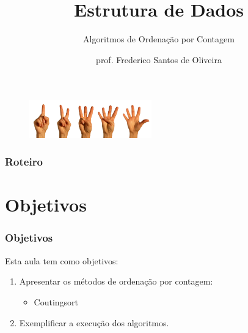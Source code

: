 \documentclass[aspectratio=169]{beamer}
\title[Algoritmos de Ordenação por Contagem]{Estrutura de Dados}
\subtitle{Algoritmos de Ordenação por Contagem}
\author[Frederico Santos de Oliveira]{prof. Frederico Santos de Oliveira}
\institute[UFMT]{Universidade Federal de Mato Grosso\\ Instituto de Engenharia}
\date{}
\begin{document}
\begin{frame}
\titlepage %

\begin{figure}[!h]
  \centering
  \includegraphics[width=150pt]{imgs/introducao.jpg}
  \label{fig_introducao}
\end{figure}
\end{frame}


\begin{frame}
\frametitle{Roteiro} %
\tableofcontents %
\end{frame}


\section{Objetivos}

\begin{frame}
\frametitle{Objetivos}

Esta aula tem como objetivos:

\begin{enumerate}
\item Apresentar os métodos de ordenação por contagem:
\begin{itemize}
 \item Coutingsort
 \end{itemize}
\item Exemplificar a execução dos algoritmos.
\end{enumerate}
\end{frame}
\end{document}
